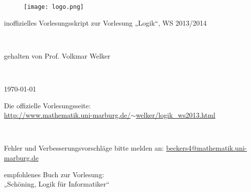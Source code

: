 \documentclass[a4paper, titlepage]{scrartcl}
\begin{document}


\begin{figure}[h]
\centering
\texttt{[image: logo.png]}
\end{figure}

\begin{center}
\begin{huge}inoffizielles Vorlesungsskript zur Vorlesung „Logik“, WS 2013/2014\end{huge}\\
\vspace{1cm}
\begin{large}gehalten von Prof. Volkmar Welker\end{large}\\
\vspace{1cm}
\begin{Large}\today \end{Large}
\end{center}

\noindent
\begin{center}
Die offizielle Vorlesungsseite:\\
\href{http://www.mathematik.uni-marburg.de/~welker/logik\_ws2013.html}{http://www.mathematik.uni-marburg.de/$\sim$welker/logik\_ws2013.html}
\end{center}

\noindent\\
\begin{center}\begin{Large}Fehler und Verbesserungsvorschläge bitte melden an: \href{mailto:beckers4@mathematik.uni-marburg.de}{beckers4@mathematik.uni-marburg.de}\end{Large}\end{center}
\vspace{1cm}
\begin{center}
empfohlenes Buch zur Vorlesung:\\
„Schöning, Logik für Informatiker“
\end{center}

\newpage

\tableofcontents

\newpage



\end{document}
